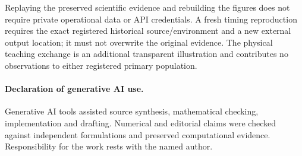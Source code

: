 Replaying the preserved scientific evidence and rebuilding the
figures does not require private operational data or API
credentials. A fresh timing reproduction requires the exact
registered historical source/environment and a new external
output location; it must not overwrite the original evidence.
The physical teaching exchange is an additional transparent
illustration and contributes no observations to either
registered primary population.

\paragraph{Declaration of generative AI use.}
Generative AI tools assisted source synthesis, mathematical
checking, implementation and drafting. Numerical and editorial
claims were checked against independent formulations and
preserved computational evidence. Responsibility for the work
rests with the named author.
